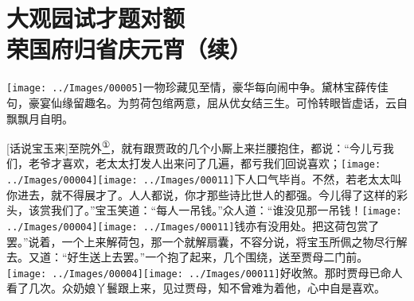 

\chapter{大观园试才题对额\\荣国府归省庆元宵（续）}
{\texttt{[image: ../Images/00005]}一物珍藏见至情，豪华每向闹中争。黛林宝薛传佳句，豪宴仙缘留趣名。为剪荷包绾两意，屈从优女结三生。可怜转眼皆虚话，云自飘飘月自明。}

{[}话说宝玉来{]}至院外\href{../Text/part0022_split_000.html\#lnkback_1_a}{\textsuperscript{①}}，就有跟贾政的几个小厮上来拦腰抱住，都说：``今儿亏我们，老爷才喜欢，老太太打发人出来问了几遍，都亏我们回说喜欢；{\texttt{[image: ../Images/00004]}\texttt{[image: ../Images/00011]}\footnotesize \kaishu 下人口气毕肖。}不然，若老太太叫你进去，就不得展才了。人人都说，你才那些诗比世人的都强。今儿得了这样的彩头，该赏我们了。''宝玉笑道：``每人一吊钱。''众人道：``谁没见那一吊钱！{\texttt{[image: ../Images/00004]}\texttt{[image: ../Images/00011]}\footnotesize \kaishu 钱亦有没用处。}把这荷包赏了罢。''说着，一个上来解荷包，那一个就解扇囊，不容分说，将宝玉所佩之物尽行解去。又道：``好生送上去罢。''一个抱了起来，几个围绕，送至贾母二门前。{\texttt{[image: ../Images/00004]}\texttt{[image: ../Images/00011]}\footnotesize \kaishu 好收煞。}那时贾母已命人看了几次。众奶娘丫鬟跟上来，见过贾母，知不曾难为着他，心中自是喜欢。

